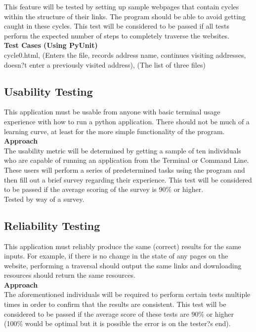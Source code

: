 \documentclass[12pt, titlepage]{article}
\begin{document}
This feature will be tested by setting up sample webpages that contain cycles within the structure of their links. The program should be able to avoid getting caught in these cycles. This test will be considered to be passed if all tests perform the expected number of steps to completely traverse the websites.\\

\textbf{Test Cases (Using PyUnit)}\\

cycle0.html, (Enters the file, records address name, continues visiting addresses, doesn?t enter a previously visited address), (The list of three files)

\subsection{Usability Testing}
This application must be usable from anyone with basic terminal usage experience with how to run a python application. There should not be much of a learning curve, at least for the more simple functionality of the program.\\

\textbf{Approach}\\

	The usability metric will be determined by getting a sample of ten individuals who are capable of running an application from the Terminal or Command Line. These users will perform a series of predetermined tasks using the program and then fill out a brief survey regarding their experience. This test will be considered to be passed if the average scoring of the survey is 90\% or higher.\\

Tested by way of a survey.

\subsection{Reliability Testing}
This application must reliably produce the same (correct) results for the same inputs. For example, if there is no change in the state of any pages on the website, performing a traversal should output the same links and downloading resources should return the same resources.\\

\textbf{Approach}\\
	
The aforementioned individuals will be required to perform certain tests multiple times in order to confirm that the results are consistent. This test will be considered to be passed if the average score of these tests are 90\% or higher (100\% would be optimal but it is possible the error is on the tester?s end).\\
\end{document}
